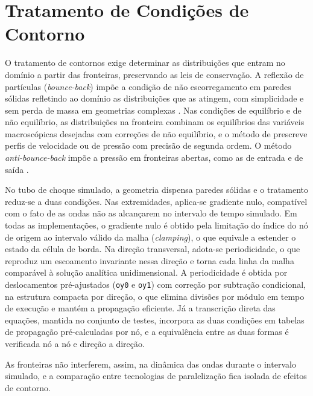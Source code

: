 
\section{Tratamento de Condições de Contorno}\label{sec:lbm-contorno-hipersonico}

O tratamento de contornos exige determinar as distribuições que entram no domínio a partir das fronteiras, preservando as leis de conservação.
A reflexão de partículas (\textit{bounce-back}) impõe a condição de não escorregamento em paredes sólidas refletindo ao domínio as distribuições que as atingem, com simplicidade e sem perda de massa em geometrias complexas \parencite{Kruger2017}.
Nas condições de equilíbrio e de não equilíbrio, as distribuições na fronteira combinam os equilíbrios das variáveis macroscópicas desejadas com correções de não equilíbrio, e o método de \textcite{Zou1997} prescreve perfis de velocidade ou de pressão com precisão de segunda ordem.
O método \textit{anti-bounce-back} impõe a pressão em fronteiras abertas, como as de entrada e de saída \parencite{Kruger2017}.

No tubo de choque simulado, a geometria dispensa paredes sólidas e o tratamento reduz-se a duas condições.
Nas extremidades, aplica-se gradiente nulo, compatível com o fato de as ondas não as alcançarem no intervalo de tempo simulado.
Em todas as implementações, o gradiente nulo é obtido pela limitação do índice do nó de origem ao intervalo válido da malha (\textit{clamping}), o que equivale a estender o estado da célula de borda.
Na direção transversal, adota-se periodicidade, o que reproduz um escoamento invariante nessa direção e torna cada linha da malha comparável à solução analítica unidimensional.
A periodicidade é obtida por deslocamentos pré-ajustados (\texttt{oy0} e \texttt{oy1}) com correção por subtração condicional, na estrutura compacta por direção, o que elimina divisões por módulo em tempo de execução e mantém a propagação eficiente.
Já a transcrição direta das equações, mantida no conjunto de testes, incorpora as duas condições em tabelas de propagação pré-calculadas por nó, e a equivalência entre as duas formas é verificada nó a nó e direção a direção.

As fronteiras não interferem, assim, na dinâmica das ondas durante o intervalo simulado, e a comparação entre tecnologias de paralelização fica isolada de efeitos de contorno.
